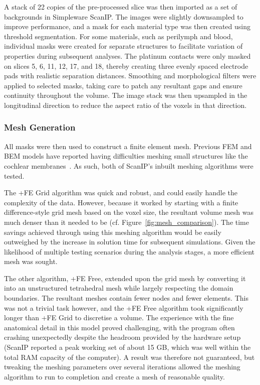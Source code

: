 A stack of 22 copies of the pre-processed slice was then imported as a set of
backgrounds in Simpleware ScanIP. The images were slightly downsampled to
improve performance, and a mask for each material type was then created using
threshold segmentation. For some materials, such as perilymph and blood,
individual masks were created for separate structures to facilitate variation of
properties during subsequent analyses. The platinum contacts were only masked on
slices 5, 6, 11, 12, 17, and 18, thereby creating three evenly spaced electrode
pads with realistic separation distances. Smoothing and morphological filters
were applied to selected masks, taking care to patch any resultant gaps and
ensure continuity throughout the volume. The image stack was then upsampled in
the longitudinal direction to reduce the aspect ratio of the voxels in that
direction.

\subsubsection{Mesh Generation}

All masks were then used to construct a finite element mesh. Previous FEM and
BEM models have reported having difficulties meshing small structures like the
cochlear membranes~\cite{frijns1995,briaire2000mesh,hanekom2001,saba2012}. As
such, both of ScanIP's inbuilt meshing algorithms were tested.

The +FE Grid algorithm was quick and robust, and could easily handle the
complexity of the data. However, because it worked by starting with a finite
difference-style grid mesh based on the voxel size, the resultant volume mesh
was much denser than it needed to be (cf. Figure~\ref{fig:mesh_comparison}). The
time savings achieved through using this meshing algorithm would be easily
outweighed by the increase in solution time for subsequent simulations. Given
the likelihood of multiple testing scenarios during the analysis stages, a more
efficient mesh was sought.

The other algorithm, +FE Free, extended upon the grid mesh by converting it into
an unstructured tetrahedral mesh while largely respecting the domain boundaries.
The resultant meshes contain fewer nodes and fewer elements. This was not a
trivial task however, and the +FE Free algorithm took significantly longer than
+FE Grid to discretise a volume. The experience with the fine anatomical detail
in this model proved challenging, with the program often crashing unexpectedly
despite the headroom provided by the hardware setup (ScanIP reported a peak
working set of about 15 GB, which was well within the total RAM capacity of the
computer). A result was therefore not guaranteed, but tweaking the meshing
parameters over several iterations allowed the meshing algorithm to run to
completion and create a mesh of reasonable quality.

